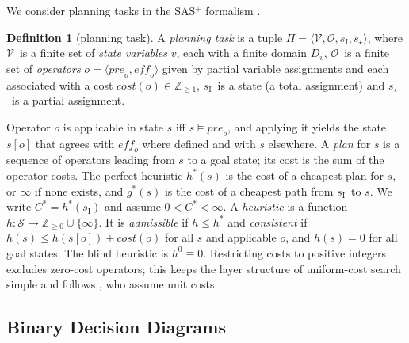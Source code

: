 \documentclass[letterpaper]{article}
\newcommand{\task}{\ensuremath{\Pi}}
\newcommand{\vars}{\ensuremath{\mathcal{V}}}
\newcommand{\ops}{\ensuremath{\mathcal{O}}}
\newcommand{\states}{\ensuremath{\mathcal{S}}}
\newcommand{\sinit}{\ensuremath{s_{\mathrm{I}}}}
\newcommand{\sgoal}{\ensuremath{s_\star}}
\newcommand{\pre}{\ensuremath{\mathit{pre}}}
\newcommand{\eff}{\ensuremath{\mathit{eff}}}
\newcommand{\cost}{\ensuremath{\mathit{cost}}}
\newcommand{\hstar}{\ensuremath{h^{*}}}
\newcommand{\hblind}{\ensuremath{h^{0}}}
\newcommand{\gstar}{\ensuremath{g^{*}}}
\newcommand{\copt}{\ensuremath{C^{*}}}
\theoremstyle{plain}
\theoremstyle{definition}
\newtheorem{definition}{Definition}
\theoremstyle{remark}
\begin{document}
We consider planning tasks in the SAS$^{+}$ formalism
\citep{backstrom-nebel-compint1995}.

\begin{definition}[planning task]
A \emph{planning task} is a tuple
$\task = \langle \vars, \ops, \sinit, \sgoal \rangle$, where \vars\ is a
finite set of \emph{state variables} $v$, each with a finite domain
$D_v$, \ops\ is a finite set of \emph{operators}
$o = \langle \pre_o, \eff_o \rangle$ given by partial variable
assignments and each associated with a cost
$\cost(o) \in \mathbb{Z}_{\geq 1}$, \sinit\ is a state (a total
assignment) and \sgoal\ is a partial assignment.
\end{definition}

Operator $o$ is applicable in state $s$ iff $s \models \pre_o$, and
applying it yields the state $s[o]$ that agrees with $\eff_o$ where
defined and with $s$ elsewhere. A \emph{plan} for $s$ is a sequence of
operators leading from $s$ to a goal state; its cost is the sum of the
operator costs. The perfect heuristic $\hstar(s)$ is the cost of a
cheapest plan for $s$, or $\infty$ if none exists, and
$\gstar(s)$ is the cost of a cheapest path from \sinit\ to $s$. We write
$\copt = \hstar(\sinit)$ and assume $0 < \copt < \infty$. A
\emph{heuristic} is a function
$h \colon \states \to \mathbb{Z}_{\geq 0} \cup \{\infty\}$. It is
\emph{admissible} if $h \leq \hstar$ and \emph{consistent} if
$h(s) \leq h(s[o]) + \cost(o)$ for all $s$ and applicable $o$, and
$h(s) = 0$ for all goal states. The blind heuristic is
$\hblind \equiv 0$. Restricting costs to positive integers excludes
zero-cost operators; this keeps the layer structure of uniform-cost
search simple and follows \citet{speck-et-al-icaps2020}, who assume unit
costs.

\subsection{Binary Decision Diagrams}
\end{document}
